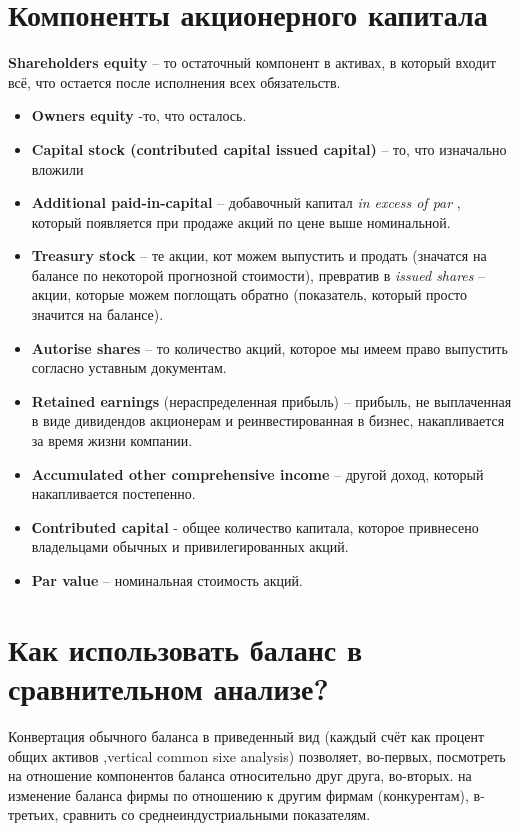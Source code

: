 \documentclass{article}
\begin{document}
\section{Компоненты акционерного капитала }
\textbf{Shareholders equity} – то остаточный компонент в активах, в который входит всё, что остается после исполнения всех обязательств. 
\begin{itemize}
\item \textbf{Owners equity} -то, что осталось.
\item \textbf{Capital stock (contributed capital issued capital) }– то, что изначально вложили
\item \textbf{Additional paid-in-capital} – добавочный капитал\textit{ in excess of par }, который появляется при продаже акций по цене выше номинальной.
\item \textbf{Treasury stock} – те акции, кот можем выпустить и продать (значатся на балансе по некоторой прогнозной стоимости), превратив в \textit{issued shares} – акции, которые можем поглощать обратно  (показатель, который просто значится на балансе).
\item \textbf{Autorise shares} – то количество акций, которое мы имеем право выпустить согласно уставным документам.
\item \textbf{Retained earnings } (нераспределенная прибыль) – прибыль, не выплаченная в виде дивидендов акционерам и реинвестированная в бизнес, накапливается за время жизни компании.
\item \textbf{Accumulated other comprehensive income} – другой доход, который накапливается постепенно.
\item \textbf{Сontributed capital } - общее количество капитала, которое привнесено владельцами обычных и привилегированных акций.
\item  \textbf{Par value} – номинальная стоимость акций.
\end{itemize}

\section{Как использовать баланс в сравнительном анализе?}
Конвертация обычного баланса в приведенный вид (каждый счёт как процент общих активов ,vertical common sixe analysis) позволяет, во-первых, посмотреть на отношение компонентов баланса относительно друг друга, во-вторых. на изменение баланса фирмы по отношению к другим фирмам (конкурентам), в-третьих, сравнить со среднеиндустриальными показателям.
\end{document}
